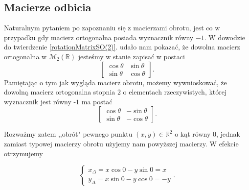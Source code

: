 \documentclass[a4paper,twoside,11pt,reqno]{mwrep}
\theoremstyle{plain} \newtheorem{twr}{Twierdzenie}
\theoremstyle{plain} \newtheorem{lem}{Lemat}
\theoremstyle{definition} \newtheorem{defi}{Definicja}
\theoremstyle{remark} \newtheorem*{wni}{Wniosek}
\theoremstyle{definition} \newtheorem{uwaga}{Uwaga}
\theoremstyle{definition}\newtheorem{prz}{Przykład}
\begin{document}
\subsection{Macierze odbicia}
Naturalnym pytaniem po zapoznaniu się z macierzami obrotu, jest co w przypadku gdy macierz
ortogonalna posiada wyznacznik równy $-1$. W dowodzie do twierdzenie \ref{rotationMatrixSO(2)}.
udało nam pokazać, że dowolna macierz ortogonalna w $\mathcal{M}_2(\mathbb{R})$ jesteśmy 
w stanie zapisać w postaci
$$\begin{bmatrix}
\cos\theta&\sin\theta \\
\sin\theta & \cos\theta
\end{bmatrix}.$$
Pamiętając o tym jak wygląda macierz obrotu, możemy wywnioskować, że dowolną macierz 
ortogonalna stopnia $2$ o elementach rzeczywistych, której wyznacznik jest równy -$1$ ma postać
$$\begin{bmatrix}
\cos\theta&-\sin\theta \\
\sin\theta & -\cos\theta
\end{bmatrix}.$$

Rozważmy zatem ,,obrót" pewnego punktu $(x,y)\in\mathbb{R}^2$ o kąt równy $0$, jednak zamiast typowej macierzy obrotu użyjemy nam powyższej macierzy. W efekcie otrzymujemy 

$$\left\{\begin{array}{l}
x_\Delta = x \cos 0 - y\sin 0 =x\\
y_\Delta = x \sin 0 - y\cos 0 = -y
\end{array} \right. . $$
\end{document}
